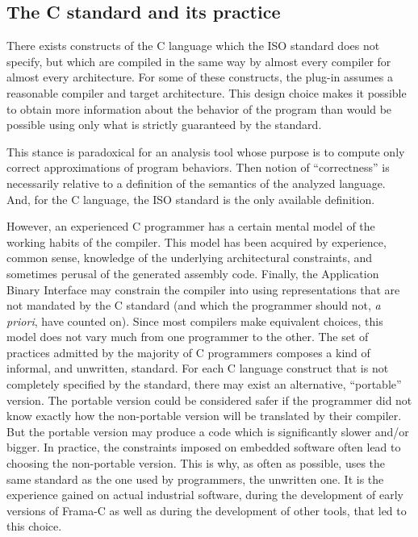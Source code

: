\documentclass{frama-c-book}
\begin{document}
\subsection{The C standard and its practice}
\label{norme_pratique}

There exists constructs of the C language which the ISO standard does
not specify, but which are compiled in the same way by almost every compiler
for almost every architecture. For some of these constructs, the \Eva{}
plug-in assumes a reasonable compiler and
target architecture. This design choice makes it possible to obtain more
information about the behavior of the program than would be possible
using only what is strictly guaranteed by the standard.
\medskip

This stance is paradoxical for an analysis tool whose purpose is
to compute only correct approximations of program behaviors.
Then notion of ``correctness'' is necessarily relative to a definition
of the semantics of the analyzed language. And, for the C language,
the ISO standard is the only available definition.

However, an experienced C programmer has a certain mental model of the
working habits of the compiler. This model has been acquired by
experience, common sense, knowledge of the underlying architectural
constraints, and sometimes perusal of the generated assembly code.
Finally, the Application Binary Interface may constrain the compiler
into using representations that are not mandated by the C standard
(and which the programmer should not, {\it a priori},
have counted on). Since most compilers make equivalent choices,
this model does not vary much from one programmer to the other.
The set of practices admitted by the majority of C programmers
composes a kind of informal, and unwritten, standard.
For each C language construct that is not completely specified by the
standard, there may exist an alternative, ``portable''
version. The portable version could be considered safer if the
programmer did not know exactly how the non-portable version will be
translated by their compiler. But the portable version may
produce a code which is significantly slower and/or bigger. In practice,
the constraints imposed on embedded software often lead to choosing
the non-portable version. This is why, as often as possible, \Eva{}
uses the same standard as the one used by programmers,
the unwritten one.
It is the experience gained on actual industrial software, during
the development of early versions of Frama-C as well as during
the development of other tools, that led to this choice.
\medskip
\end{document}
